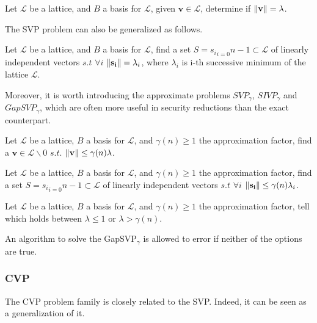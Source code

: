 \begin{definition}
Let $\mathscr{L}$ be a lattice, and $B$ a basis for $\mathscr{L}$, given $\mathbf{v}\in\mathscr{L}$, determine if $\left\lVert \mathbf{v} \right\rVert = \lambda$.
\end{definition}

The SVP problem can also be generalized as follows.

\begin{definition}
Let $\mathscr{L}$ be a lattice, and $B$ a basis for $\mathscr{L}$, find a set $S={s_i}_{i=0}{n-1}\subset \mathscr{L}$ of linearly independent vectors $s.t$ $\forall i$ $\left\lVert \mathbf{s_i} \right\rVert = \lambda_i$, where $\lambda_i$ is i-th successive minimum of the lattice $\mathscr{L}$.
\end{definition}

Moreover, it is worth introducing the approximate problems $SVP_\gamma$, $SIVP_\gamma$ and $GapSVP_\gamma$, which are often more useful in security reductions than the exact counterpart.

\begin{definition}
Let $\mathscr{L}$ be a lattice, $B$ a basis for $\mathscr{L}$, and $\gamma(n)\geq1$ the approximation factor, find a $\mathbf{v}\in\mathscr{L}\backslash0$ $s.t.$ $\left\lVert \mathbf{v} \right\rVert \leq \gamma(n)\lambda$.
\end{definition}

\begin{definition}
Let $\mathscr{L}$ be a lattice, $B$ a basis for $\mathscr{L}$, and $\gamma(n)\geq1$ the approximation factor, find a set $S={s_i}_{i=0}{n-1}\subset \mathscr{L}$ of linearly independent vectors $s.t$ $\forall i$ $\left\lVert \mathbf{s_i} \right\rVert \leq \gamma(n)\lambda_i$.
\end{definition}

\begin{definition}
Let $\mathscr{L}$ be a lattice, $B$ a basis for $\mathscr{L}$, and $\gamma(n)\geq1$ the approximation factor, tell which holds between $\lambda\leq1$ or $\lambda > \gamma(n)$.
\end{definition}
\begin{remark}
An algorithm to solve the GapSVP$_\gamma$ is allowed to error if neither of the options are true.
\end{remark}

\subsubsection{CVP}
The CVP problem family is closely related to the SVP. Indeed, it can be seen as a generalization of it.

